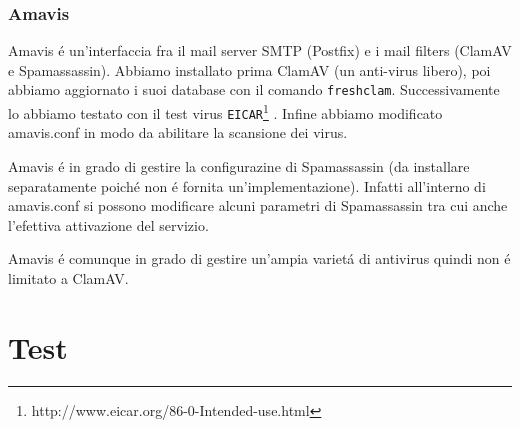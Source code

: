 \documentclass[9pt, a4paper, oneside]{article}
\begin{document}
		\section{Amavis}
			\par
				Amavis \'e un'interfaccia fra il mail server 
				SMTP (Postfix) e i mail filters (ClamAV e 
				Spamassassin). Abbiamo installato prima ClamAV 
				(un anti-virus libero), poi abbiamo aggiornato 
				i suoi database con il comando 
				\texttt{freshclam}. Successivamente lo abbiamo 
				testato con il test virus 
				\texttt{EICAR}\footnote{http://www.eicar.org/86-0-Intended-use.html}
				. Infine abbiamo modificato amavis.conf in 
				modo da abilitare la scansione dei virus.
			\par
				Amavis \'e in grado di gestire la configurazine 
				di Spamassassin (da installare 
				separatamente poich\'e non \'e fornita 
				un'implementazione). Infatti all'interno di 
				amavis.conf si possono modificare alcuni 
				parametri di Spamassassin tra cui anche 
				l'efettiva attivazione del servizio.
			\par
				Amavis \'e comunque in grado di gestire 
				un'ampia variet\'a di antivirus quindi non \'e 
				limitato a ClamAV.
	\part{Test}
\end{document}
